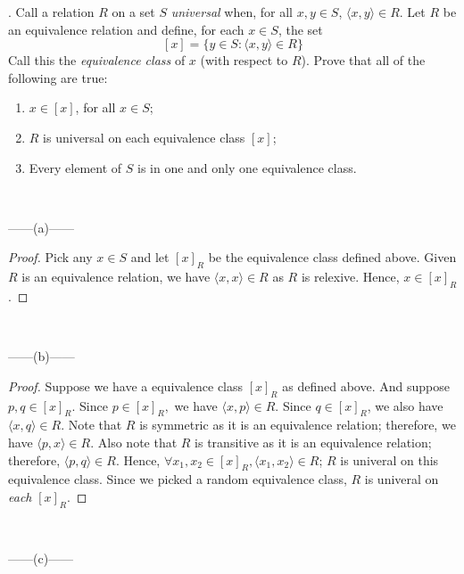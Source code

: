 \documentclass[12pt]{article}
\begin{document}
\newpage
{}. Call a relation $R$ on a set $S$ \emph{universal} when, for all $x, y \in S$, 
$\langle x, y \rangle \in R$. Let $R$ be an equivalence relation and define, for each
$x \in S$, the set 
$$[x] = \{y \in S : \langle x , y \rangle \in R\}$$
\noindent
Call this the \emph{equivalence class} of $x$ (with respect to $R$). Prove that all
of the following are true:
\begin{enumerate}
\renewcommand{\labelenumi}{\alph{enumi}.}
\item $x \in [x]$, for all $x \in S$;
\item $R$ is universal on each equivalence class $[x]$;
\item Every element of $S$ is in one and only one equivalence class.
\end{enumerate}
~~~
\begin{center}
    ------(a)------
\end{center}
\begin{proof}
    Pick any $x \in S$ and let $[x]_R$ be the equivalence class defined above. 
    Given $R$ is an equivalence relation, we have $\langle x,x \rangle \in R$ as $R$ is relexive.
    Hence, $x \in [x]_R$.
\end{proof}
~~~
\begin{center}
    ------(b)------
\end{center}
\begin{proof}
    Suppose we have a equivalence class $[x]_R$ as defined above. And suppose $p, q \in [x]_R$.
    Since $p \in [x]_R,$ we have $\langle x, p \rangle \in R$. Since $q \in [x]_R$, we also have
    $\langle x,q \rangle \in R$. Note that $R$ is symmetric as it is an equivalence relation;
    therefore, we have $\langle p,x \rangle \in R$. Also note that $R$ is transitive as it is an
    equivalence relation; therefore, $\langle p,q \rangle \in R$. Hence, $\forall x_1, x_2 \in [x]_R, 
    \langle x_1, x_2 \rangle \in R$; $R$ is univeral on this equivalence class. Since we picked a
    random equivalence class, $R$ is univeral on \emph{each} $[x]_R$.
\end{proof}
~~~
\begin{center}
    ------(c)------
\end{center}
\end{document}
